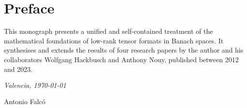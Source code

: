 
\chapter*{Preface}
\label{chap:preface}

This monograph presents a unified and self-contained treatment of the
mathematical foundations of low-rank tensor formats in Banach spaces.
It synthesises and extends the results of four research papers by the
author and his collaborators Wolfgang Hackbusch and Anthony Nouy,
published between 2012 and 2023.

\medskip

\noindent\textit{Valencia, \today}

\hfill Antonio Falcó
